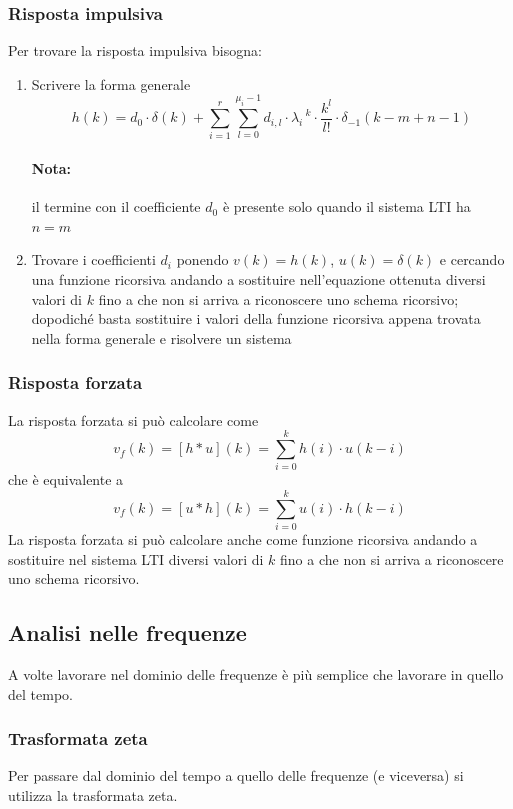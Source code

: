 \documentclass[a4paper]{article}
\begin{document}
	\subsubsection{Risposta impulsiva}
	Per trovare la risposta impulsiva bisogna:
	
	\begin{enumerate}
		\item Scrivere la forma generale
			\[
			h(k) = d_0 \cdot \delta(k) + \sum_{i=1}^r \sum_{l=0}^{\mu_i-1} d_{i,l} \cdot \lambda^{\text{ }k}_i \cdot \frac{k^l}{l!} \cdot \delta_{-1}(k-m+n-1)
			\]
			\paragraph{Nota:}
			il termine con il coefficiente $d_0$ è presente solo quando il sistema LTI ha $n = m$
		\item Trovare i coefficienti $d_i$ ponendo $v(k) = h(k)$, $u(k) = \delta(k)$ e cercando una funzione ricorsiva andando a sostituire nell'equazione ottenuta diversi valori di $k$ fino a che non si arriva a riconoscere uno schema ricorsivo; dopodiché basta sostituire i valori della funzione ricorsiva appena trovata nella forma generale e risolvere un sistema
	\end{enumerate}
	
	\subsubsection{Risposta forzata}
	La risposta forzata si può calcolare come
	\[ v_f(k) = [h*u](k) = \sum_{i=0}^k h(i) \cdot u(k-i) \]
	che è equivalente a
	\[ v_f(k) = [u*h](k) = \sum_{i=0}^k u(i) \cdot h(k-i) \]
	La risposta forzata si può calcolare anche come funzione ricorsiva andando a sostituire nel sistema LTI diversi valori di $k$ fino a che non si arriva a riconoscere uno schema ricorsivo.
	
	\subsection{Analisi nelle frequenze}
	A volte lavorare nel dominio delle frequenze è più semplice che lavorare in quello del tempo.

	\subsubsection{Trasformata zeta}
	Per passare dal dominio del tempo a quello delle frequenze (e viceversa) si utilizza la trasformata zeta.
\end{document}
